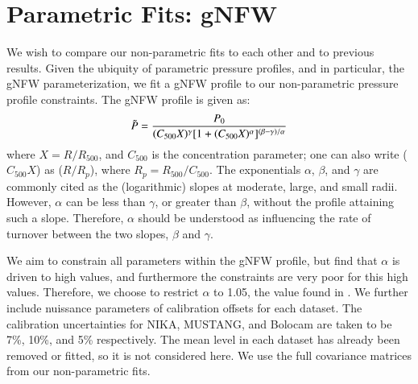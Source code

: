 \documentclass[twocolumn,traditabstract]{aa}
\begin{document}


\section{Parametric Fits: gNFW}
\label{sec:parfits}

We wish to compare our non-parametric fits to each other and to previous results. Given the ubiquity of
parametric pressure profiles, and in particular, the gNFW parameterization, we fit a gNFW profile
to our non-parametric pressure profile constraints. The gNFW profile is given as:
\begin{equation}
  \Tilde{P} = \frac{P_0}{(C_{500} X)^{\gamma} [1 + (C_{500} X)^{\alpha}]^{(\beta - \gamma)/\alpha}}
  \label{eqn:gnfw_profile}
\end{equation}
where $X = R / R_{500}$, and $C_{500}$ is the concentration parameter; one can also write ($C_{500} X$) as
($R / R_p$), where $R_p = R_{500}/C_{500}$. The exponentials $\alpha$, $\beta$, and $\gamma$ are commonly
cited as the (logarithmic) slopes at moderate, large, and small radii. However, $\alpha$ can be less than
$\gamma$, or greater than $\beta$, without the profile attaining such a slope. Therefore, $\alpha$ should
be understood as influencing the rate of turnover between the two slopes, $\beta$ and $\gamma$. 


We aim to constrain all parameters within the gNFW profile, but find that $\alpha$ is driven to high values, and
furthermore the constraints are very poor for this high values. Therefore, we choose to restrict $\alpha$ to 1.05,
the value found in \citet{arnaud2010}. We further include nuissance parameters of calibration offsets for each dataset.
The calibration uncertainties for NIKA, MUSTANG, and Bolocam are taken to be 7\%, 10\%, and 5\% respectively.
The mean level in each dataset has already been removed or fitted, so it is not considered here. We use the full
covariance matrices from our non-parametric fits.
\end{document}
